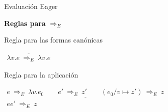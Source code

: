 \documentclass[handout]{beamer}
\begin{document}
\begin{frame}{Evaluación Eager}

\textbf{Reglas para} $\Rightarrow_E$

\bigskip

Regla para las formas canónicas

\bigskip

$\begin{array}{c}
\overline{\lambda v.e\ \Rightarrow_E\ \lambda v.e}
\end{array}
$
\pause
\bigskip

\medskip


Regla para la aplicación

\bigskip

$\begin{array}{c}
\underline{e\ \Rightarrow_E\ \lambda v.e_0\qquad e'\ \Rightarrow_E\ z'\qquad(e_0/v\mapsto z')\ \Rightarrow_E\ z}\\
ee'\ \Rightarrow_E\ z
\end{array}
$
\end{frame}
\end{document}
